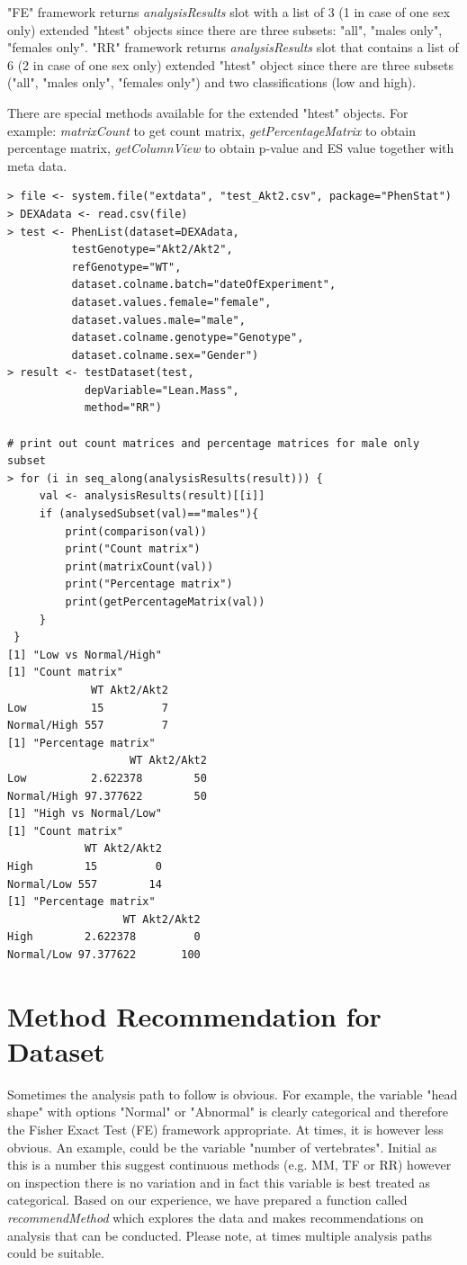 \documentclass[12pt,a4paper]{article}
\begin{document}
"FE" framework returns \textit{analysisResults} slot with  a list of 3 (1 in case of one sex only) extended "htest" objects since there are three subsets: "all", "males only", "females only".
"RR" framework returns \textit{analysisResults} slot that contains a list of 6 (2 in case of one sex only) extended "htest" object since there are three subsets ("all", "males only", "females only") and two classifications (low and high).

There are special methods available for the extended "htest" objects. For example: \textit{matrixCount} to get count matrix, \textit{getPercentageMatrix} to obtain percentage matrix, \textit{getColumnView} to obtain p-value and ES value together with meta data.

\begingroup
    \fontsize{8pt}{12pt}\selectfont
\begin{verbatim}
> file <- system.file("extdata", "test_Akt2.csv", package="PhenStat") 
> DEXAdata <- read.csv(file)
> test <- PhenList(dataset=DEXAdata,
		  testGenotype="Akt2/Akt2",
		  refGenotype="WT",
		  dataset.colname.batch="dateOfExperiment",
		  dataset.values.female="female",
		  dataset.values.male="male", 
		  dataset.colname.genotype="Genotype", 
		  dataset.colname.sex="Gender")
> result <- testDataset(test, 
			depVariable="Lean.Mass", 
			method="RR")
			
# print out count matrices and percentage matrices for male only subset			
> for (i in seq_along(analysisResults(result))) {
     val <- analysisResults(result)[[i]]
     if (analysedSubset(val)=="males"){
     	 print(comparison(val))
     	 print("Count matrix")
         print(matrixCount(val))   
         print("Percentage matrix")
         print(getPercentageMatrix(val))     
     }
 }
[1] "Low vs Normal/High"
[1] "Count matrix"
             WT Akt2/Akt2
Low          15         7
Normal/High 557         7
[1] "Percentage matrix"
                   WT Akt2/Akt2
Low          2.622378        50
Normal/High 97.377622        50
[1] "High vs Normal/Low"
[1] "Count matrix"
            WT Akt2/Akt2
High        15         0
Normal/Low 557        14
[1] "Percentage matrix"
                  WT Akt2/Akt2
High        2.622378         0
Normal/Low 97.377622       100
\end{verbatim}
\endgroup 
\section{Method Recommendation for Dataset}
\label{section:Recommendation}

Sometimes the analysis path to follow is obvious. For example, the variable "head shape" with options "Normal" or "Abnormal" is clearly categorical and therefore the Fisher Exact Test (FE) framework appropriate. At times, it is however less obvious. An example, could be the variable "number of vertebrates". Initial as this is a number this suggest continuous methods (e.g. MM, TF or RR)  however on inspection there is no variation and in fact this variable is best treated as categorical. Based on our experience, we have prepared a function called \textit{recommendMethod} which explores the data and makes recommendations on analysis that can be conducted. Please note, at times multiple analysis paths could be suitable. 
\end{document}
